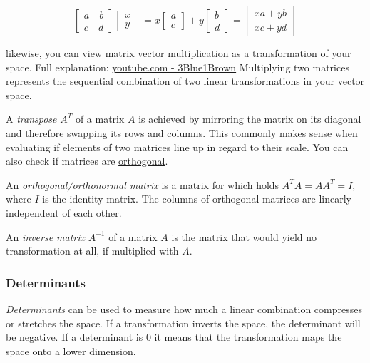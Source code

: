 \documentclass[
]{book}
\begin{document}
\[\begin{bmatrix} a \quad b \\ c \quad d \end{bmatrix} 
\begin{bmatrix} x \\ y \end{bmatrix}
  = x \begin{bmatrix} a \\ c \end{bmatrix} + y \begin{bmatrix} b \\ d \end{bmatrix} = \begin{bmatrix} x a  + y b \\ x c + y d \end{bmatrix}
\]

likewise, you can view matrix vector multiplication as a transformation
of your space. Full explanation: \href{https://youtu.be/kYB8IZa5AuE}{youtube.com -
3Blue1Brown} Multiplying two matrices
represents the sequential combination of two linear transformations in
your vector space.

A \emph{transpose} \(A^T\) of a matrix \(A\) is achieved by mirroring the matrix
on its diagonal and therefore swapping its rows and columns. This
commonly makes sense when evaluating if elements of two matrices line up
in regard to their scale. You can also check if matrices are
\href{https://en.wikipedia.org/wiki/Orthogonal_matrix}{orthogonal}.

An \emph{orthogonal/orthonormal matrix} is a matrix for which holds
\(A^TA=AA^T=I\), where \(I\) is the identity matrix. The columns of
orthogonal matrices are linearly independent of each other.

An \emph{inverse matrix} \(A^{-1}\) of a matrix \(A\) is the matrix that would
yield no transformation at all, if multiplied with \(A\).

\hypertarget{determinants}{%
\subsubsection{Determinants}\label{determinants}}

\emph{Determinants} can be used to measure how much a linear combination
compresses or stretches the space. If a transformation inverts the
space, the determinant will be negative. If a determinant is 0 it means
that the transformation maps the space onto a lower dimension.
\end{document}
